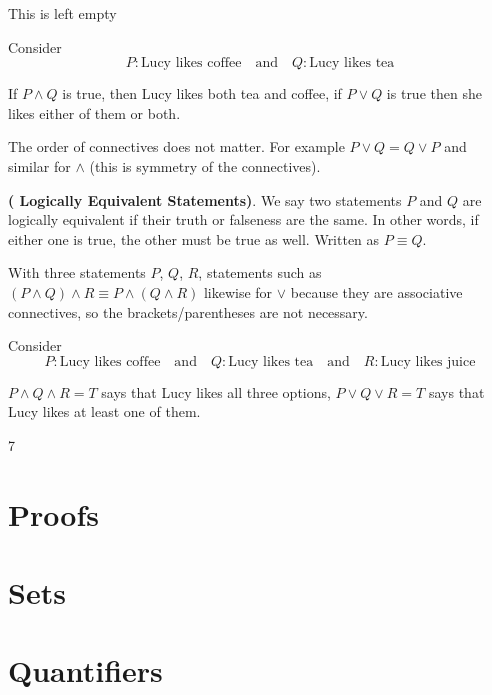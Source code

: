 \begin{remark}
    This is left empty
\end{remark}

\begin{example}
    Consider
    $$
    P: \text{Lucy likes coffee} \quad \text{and} \quad Q: \text{Lucy likes tea}
    $$

    If $P \land Q$ is true, then Lucy likes both tea and coffee, if $P \lor Q$ is true then she likes either of them or both.
\end{example}

The order of connectives does not matter. For example $P \lor Q = Q \lor P$ and similar for $\land$ (this is symmetry of the connectives).

\begin{definition} \textbf{( Logically Equivalent Statements)}. We say two statements $P$ and $Q$ are logically equivalent if their truth or falseness are the same. In other words, if either one is true, the other must be true as well. Written as $P \equiv Q$.
\end{definition}

With three statements $P$, $Q$, $R$, statements such as $(P \land Q) \land R \equiv P \land (Q \land R)$ likewise for $\lor$ because they are associative connectives, so the brackets/parentheses are not necessary. 

\begin{example}
    Consider 
    $$ 
    P: \text{Lucy likes coffee} \quad \text{and} \quad Q: \text{Lucy likes tea} \quad \text{and} \quad R: \text{Lucy likes juice}
    $$

    $P \land Q \land R = T$ says that Lucy likes all three options, $P \lor Q \lor R = T$ says that Lucy likes at least one of them.
\end{example}

7

\section{Proofs}

\section{Sets}

\section{Quantifiers}

\
















